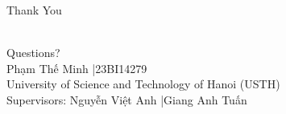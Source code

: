\begin{frame}{Thank You}
  \vfill
  \begin{center}
    \color{CVBLUE}{\Huge\bfseries Thank You}\\[16pt]
    {\Large Questions?}\\[24pt]
    {\normalsize\color{black} Phạm Thế Minh \quad|\quad 23BI14279}\\[6pt]
    {\small\color{black} University of Science and Technology of Hanoi (USTH)}\\[6pt]
    {\footnotesize\mdseries\color{black} Supervisors: Nguyễn Việt Anh \quad|\quad Giang Anh Tuấn}
  \end{center}
  \vfill
\end{frame}
